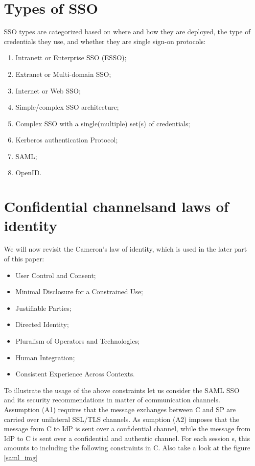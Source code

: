 \documentclass[a4paper,12pt,oneside]{mybook}
\begin{document}
\section{Types of SSO}
SSO types are categorized based on where and how they are deployed, the type of credentials they use, and whether they are single sign-on protocols:
\begin{enumerate}
    \item Intranett or Enterprise SSO (ESSO);
    \item Extranet or Multi-domain SSO;
    \item Internet or Web SSO;
    \item Simple/complex SSO architecture;
    \item Complex SSO with a single(multiple) set(s) of credentials;
    \item Kerberos authentication Protocol;
    \item SAML;
    \item OpenID.
\end{enumerate}

\section{Confidential channelsand laws of identity}
We will now revisit the Cameron’s law of identity, which is used in the
later part of this paper:
\begin{itemize}
    \item User Control and Consent;
    \item Minimal Disclosure for a Constrained Use;
    \item Justifiable Parties;
    \item Directed Identity;
    \item Pluralism of Operators and Technologies;
    \item Human Integration;
    \item Consistent Experience Across Contexts.
\end{itemize}

To illustrate the usage of the above constraints let us consider the SAML SSO and its security recommendations in matter of communication channels. Assumption (A1) requires that the message exchanges between C and SP are carried over unilateral SSL/TLS channels. As sumption (A2) imposes that the message from C to IdP is sent over a confidential channel, while the message from IdP to C is sent over a confidential and authentic channel. For each session s, this amounts to including the following constraints in C. Also take a look at the figure \ref{saml_img}
\end{document}
